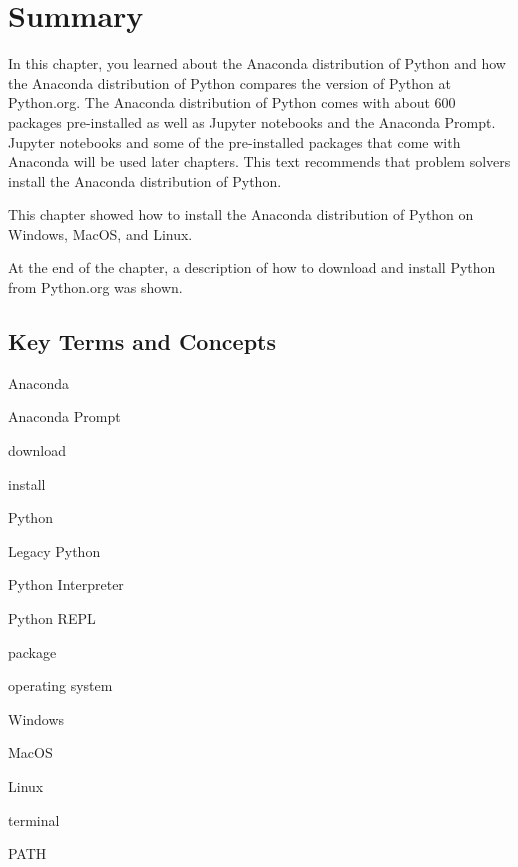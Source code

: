 \documentclass{book}
\newenvironment{key_terms}{\begin{multicols}{3}}{\end{multicols}} %
\begin{document}
    
        \newpage
        \section{Summary}\label{summary}

    




    
        In this chapter, you learned about the Anaconda distribution of Python
and how the Anaconda distribution of Python compares the version of
Python at Python.org. The Anaconda distribution of Python comes with
about 600 packages pre-installed as well as Jupyter notebooks and the
Anaconda Prompt. Jupyter notebooks and some of the pre-installed
packages that come with Anaconda will be used later chapters. This text
recommends that problem solvers install the Anaconda distribution of
Python.

This chapter showed how to install the Anaconda distribution of Python
on Windows, MacOS, and Linux.

At the end of the chapter, a description of how to download and install
Python from Python.org was shown.
    




    
        \subsection{Key Terms and Concepts}\label{key-terms-and-concepts}
    




    
        \begin{key_terms}
        Anaconda

Anaconda Prompt

download

install

Python

Legacy Python

Python Interpreter

Python REPL

package

operating system

Windows

MacOS

Linux

terminal

PATH
        \end{key_terms}

    
\end{document}
